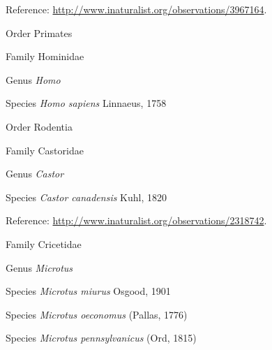 \documentclass[9pt, article]{memoir}
\begin{document}
\begin{multicols}{2}
\vspace{6pt}Reference: 
\url{http://www.inaturalist.org/observations/3967164}.

\vspace{6pt}\noindent\hspace{18pt}Order Primates


\vspace{6pt}\noindent\hspace{24pt}Family Hominidae


\vspace{6pt}\noindent\hspace{30pt}Genus \textit{Homo}


\vspace{6pt}\noindent\hspace{36pt}Species \textit{Homo sapiens} Linnaeus, 1758


\vspace{6pt}\noindent\hspace{18pt}Order Rodentia


\vspace{6pt}\noindent\hspace{24pt}Family Castoridae


\vspace{6pt}\noindent\hspace{30pt}Genus \textit{Castor}


\vspace{6pt}\noindent\hspace{36pt}Species \textit{Castor canadensis} Kuhl, 1820


\vspace{6pt}Reference: 
\url{http://www.inaturalist.org/observations/2318742}.

\vspace{6pt}\noindent\hspace{24pt}Family Cricetidae


\vspace{6pt}\noindent\hspace{30pt}Genus \textit{Microtus}


\vspace{6pt}\noindent\hspace{36pt}Species \textit{Microtus miurus} Osgood, 1901


\vspace{6pt}\noindent\hspace{36pt}Species \textit{Microtus oeconomus} (Pallas, 1776)


\vspace{6pt}\noindent\hspace{36pt}Species \textit{Microtus pennsylvanicus} (Ord, 1815)



\end{multicols}
\end{document}
